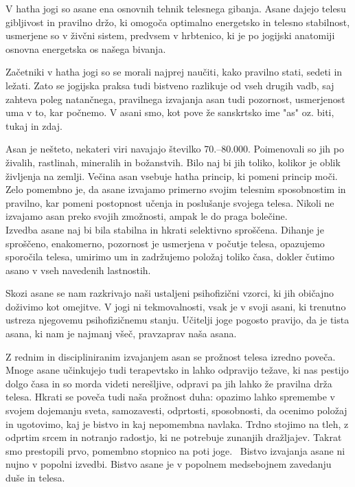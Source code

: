 \documentclass[a4paper, 12pt]{book}
\begin{document}
V hatha jogi so asane ena osnovnih tehnik telesnega gibanja. Asane dajejo telesu gibljivost in pravilno držo, ki omogoča optimalno energetsko in telesno stabilnost, usmerjene so v živčni sistem, predvsem v hrbtenico, ki je po jogijski anatomiji osnovna energetska os našega bivanja.

Začetniki v hatha jogi so se morali najprej naučiti, kako pravilno stati, sedeti in ležati. Zato se jogijska praksa tudi bistveno razlikuje od vseh drugih vadb, saj zahteva poleg natančnega, pravilnega izvajanja asan tudi pozornost, usmerjenost uma v to, kar počnemo. V asani smo, kot pove že sanskrtsko ime "as" oz. biti, tukaj in zdaj.

Asan je nešteto, nekateri viri navajajo številko 70.–80.000. Poimenovali so jih po živalih, rastlinah, mineralih in  božanstvih. Bilo naj bi jih toliko, kolikor je oblik življenja na zemlji. Večina asan vsebuje hatha princip, ki pomeni princip moči. Zelo pomembno je, da asane izvajamo primerno svojim telesnim sposobnostim in pravilno, kar pomeni postopnost učenja in poslušanje svojega telesa. Nikoli ne izvajamo asan preko svojih zmožnosti, ampak le do praga bolečine. \\ 

Izvedba asane naj bi bila stabilna in hkrati selektivno sproščena. Dihanje je sproščeno, enakomerno, pozornost je usmerjena v počutje telesa, opazujemo sporočila telesa, umirimo um in zadržujemo položaj toliko časa, dokler čutimo asano v vseh navedenih lastnostih. 

Skozi asane se nam razkrivajo naši ustaljeni psihofizični vzorci, ki jih običajno doživimo kot omejitve. V jogi ni tekmovalnosti, vsak je v svoji asani, ki trenutno ustreza njegovemu psihofizičnemu stanju. Učitelji joge pogosto pravijo, da je tista asana, ki nam je najmanj všeč, pravzaprav naša asana.

Z rednim in discipliniranim izvajanjem asan se prožnost telesa izredno poveča. Mnoge asane učinkujejo tudi terapevtsko in lahko odpravijo težave, ki nas pestijo dolgo časa in so morda videti nerešljive, odpravi pa jih lahko že pravilna drža telesa. Hkrati se poveča tudi naša prožnost duha: opazimo lahko spremembe v svojem dojemanju sveta, samozavesti, odprtosti, sposobnosti, da ocenimo položaj in ugotovimo, kaj je bistvo in kaj nepomembna navlaka. Trdno stojimo na tleh, z odprtim srcem in notranjo radostjo, ki ne potrebuje zunanjih dražljajev. Takrat smo prestopili prvo, pomembno stopnico na poti joge.~\cite{Asane}
Bistvo izvajanja asane ni nujno v popolni izvedbi. Bistvo asane je v popolnem medsebojnem zavedanju duše in telesa.
\end{document}
